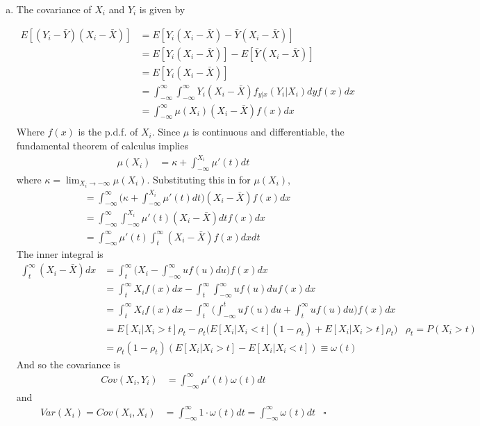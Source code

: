 \documentclass[11pt]{article}
\begin{document}
\begin{enumerate}[a)]

	\item The covariance of $X_i$ and $Y_i$ is given by

	\begin{align*}
		E[(Y_i - \bar{Y})(X_i - \bar{X})] &=  E[Y_i(X_i - \bar{X}) - \bar{Y}(X_i - \bar{X})] \\
		&= E[Y_i(X_i - \bar{X})]- E[\bar{Y}(X_i - \bar{X})] \\
		&= E[Y_i(X_i - \bar{X})] \\
		&= \int_{-\infty}^{\infty} \int_{-\infty}^{\infty} Y_i (X_i - \bar{X}) f_{y|x}(Y_i|X_i)dy f(x)dx \\
		&= \int_{-\infty}^{\infty} \mu(X_i) (X_i - \bar{X}) f(x)dx \\
	\end{align*}
	Where $f(x)$ is the p.d.f. of $X_i$. Since $\mu$ is continuous and differentiable, the fundamental theorem of calculus implies
	\begin{align*}
		\mu(X_i) &= \kappa + \int_{-\infty}^{X_i}\mu'(t) dt
	\end{align*}
	where $\kappa = \lim_{X_i \rightarrow -\infty} \mu(X_i)$. Substituting this in for $\mu(X_i)$,
	\begin{align*}
		&= \int_{-\infty}^{\infty} \Big( \kappa + \int_{-\infty}^{X_i}\mu'(t) dt \Big) (X_i - \bar{X}) f(x) dx \\
		&= \int_{-\infty}^{\infty} \int_{-\infty}^{X_i}\mu'(t) (X_i - \bar{X}) dt f(x)dx \\
		&= \int_{-\infty}^{\infty} \mu'(t) \int_{t}^{\infty } (X_i - \bar{X}) f(x)dxdt
	\end{align*}
	The inner integral is
	\begin{align*}
		\int_{t}^{\infty} (X_i - \bar{X}) dx &= \int_{t}^{\infty} \bigg( X_i - \int_{-\infty}^{\infty} u f(u)du \bigg) f(x)dx \\
		&= \int_{t}^{\infty} X_i f(x)dx - \int_{t}^{\infty} \int_{-\infty}^{\infty} u f(u)du f(x)dx \\
		&= \int_{t}^{\infty} X_i f(x)dx - \int_{t}^{\infty} \bigg( \int_{-\infty}^{t} u f(u)du + \int_{t}^{\infty} u f(u)du \bigg) f(x)dx \\
		&= E[X_i | X_i > t] \rho_t - \rho_t \bigg( E[X_i | X_i < t] (1 - \rho_t) + E[X_i | X_i > t] \rho_t \bigg) &\mbox{$\rho_t = P(X_i > t)$} \\
		&= \rho_t(1-\rho_t) (E[X_i | X_i > t] - E[X_i | X_i < t]) \equiv \omega(t)
	\end{align*}
	And so the covariance is
	\begin{align*}
		Cov(X_i,Y_i) &= \int_{-\infty}^{\infty} \mu'(t) \omega(t) dt
	\end{align*}
	and
	\begin{align*}
		Var(X_i) = Cov(X_i,X_i) &= \int_{-\infty}^{\infty} 1 \cdot \omega(t) dt = \int_{-\infty}^{\infty} \omega(t) dt &\square
	\end{align*}	


\end{enumerate}
\end{document}
